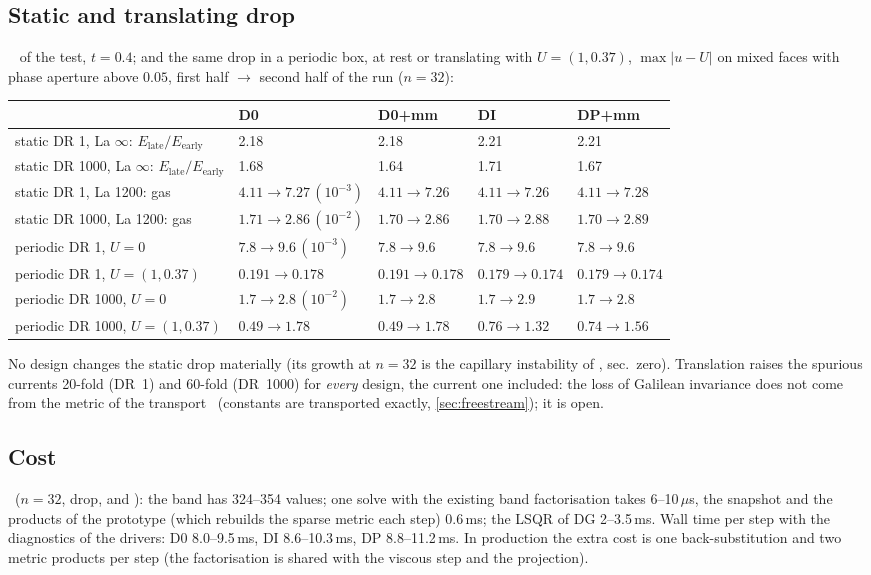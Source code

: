\subsection{Static and translating drop}\label{sec:drop}
\meas\  of the test, $t=0.4$; and the same drop in
a periodic box, at rest or translating with $U=(1,0.37)$, $\max|u-U|$ on mixed faces with
phase aperture above $0.05$, first half $\to$ second half of the run ($n=32$):
\begin{center}\footnotesize
\setlength\tabcolsep{4pt}
\begin{tabular}{@{}lllll@{}}
\toprule
 & D0 & D0+mm & DI & DP+mm\\
\midrule
static DR 1, La $\infty$: $E_{\text{late}}/E_{\text{early}}$ & 2.18 & 2.18 & 2.21 & 2.21\\
static DR 1000, La $\infty$: $E_{\text{late}}/E_{\text{early}}$ & 1.68 & 1.64 & 1.71 & 1.67\\
static DR 1, La 1200: gas & $4.11\to7.27\,(10^{-3})$ & $4.11\to7.26$ & $4.11\to7.26$ & $4.11\to7.28$\\
static DR 1000, La 1200: gas & $1.71\to2.86\,(10^{-2})$ & $1.70\to2.86$ & $1.70\to2.88$ & $1.70\to2.89$\\
periodic DR 1, $U=0$ & $7.8\to9.6\,(10^{-3})$ & $7.8\to9.6$ & $7.8\to9.6$ & $7.8\to9.6$\\
periodic DR 1, $U=(1,0.37)$ & $0.191\to0.178$ & $0.191\to0.178$ & $0.179\to0.174$ & $0.179\to0.174$\\
periodic DR 1000, $U=0$ & $1.7\to2.8\,(10^{-2})$ & $1.7\to2.8$ & $1.7\to2.9$ & $1.7\to2.8$\\
periodic DR 1000, $U=(1,0.37)$ & $0.49\to1.78$ & $0.49\to1.78$ & $0.76\to1.32$ & $0.74\to1.56$\\
\bottomrule
\end{tabular}
\end{center}
No design changes the static drop materially (its growth at $n=32$ is the capillary
instability of , sec.~zero).  Translation raises the spurious
currents 20-fold (DR~1) and 60-fold (DR~1000) for \emph{every} design, the current one
included: the loss of Galilean invariance does not come from the metric of the transport
\infr\ (constants are transported exactly, \cref{sec:freestream}); it is open.

\subsection{Cost}\label{sec:cost}
\meas\ ($n=32$, drop,  and ): the band has 324--354 values;
one solve with the existing band factorisation takes 6--10\,$\mu$s, the snapshot and the
products of the prototype (which rebuilds the sparse metric each step) 0.6\,ms; the LSQR of
DG 2--3.5\,ms.  Wall time per step with the diagnostics of the drivers: D0 8.0--9.5\,ms, DI
8.6--10.3\,ms, DP 8.8--11.2\,ms.  In production the extra cost is one back-substitution and
two metric products per step (the factorisation is shared with the viscous step and the
projection).

